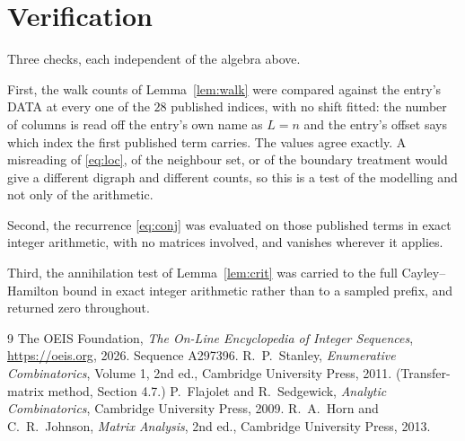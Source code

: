 \documentclass[11pt,a4paper]{article}
\theoremstyle{plain}
\theoremstyle{definition}
\begin{document}
\section{Verification}

Three checks, each independent of the algebra above.

First, the walk counts of Lemma~\ref{lem:walk} were compared against the entry's DATA at
every one of the $28$ published indices, with no shift fitted: the number of columns is
read off the entry's own name as $L=n$ and the entry's offset says which index the first
published term carries. The values agree exactly. A misreading of \eqref{eq:loc}, of the
neighbour set, or of the boundary treatment would give a different digraph and different
counts, so this is a test of the modelling and not only of the arithmetic.

Second, the recurrence \eqref{eq:conj} was evaluated on those published terms in exact
integer arithmetic, with no matrices involved, and vanishes wherever it applies.

Third, the annihilation test of Lemma~\ref{lem:crit} was carried to the full
Cayley--Hamilton bound in exact integer arithmetic rather than to a sampled prefix, and
returned zero throughout.

\begin{thebibliography}{9}
 The OEIS Foundation, \emph{The On-Line Encyclopedia of Integer
Sequences}, \url{https://oeis.org}, 2026. Sequence A297396.
 R.~P.~Stanley, \emph{Enumerative Combinatorics}, Volume 1, 2nd ed.,
Cambridge University Press, 2011. (Transfer-matrix method, Section 4.7.)
 P.~Flajolet and R.~Sedgewick, \emph{Analytic Combinatorics}, Cambridge
University Press, 2009.
 R.~A.~Horn and C.~R.~Johnson, \emph{Matrix Analysis}, 2nd ed., Cambridge
University Press, 2013.
\end{thebibliography}
\end{document}
